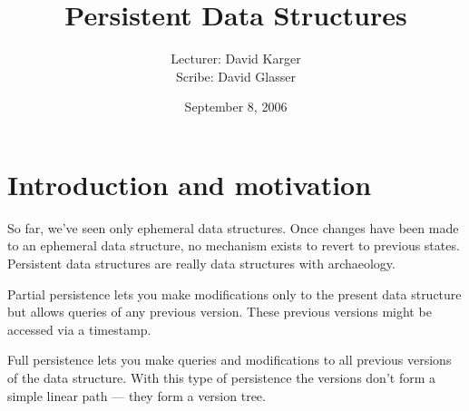 \documentclass{article}
\title{Persistent Data Structures}
\date{September 8, 2006}
\author{Lecturer: David Karger\\ Scribe: David Glasser}
\begin{document}
%

%
%
%
%

%


\section{Introduction and motivation}
\label{crp}

So far, we've seen only ephemeral data structures.  Once changes have been made to an
ephemeral data structure, no mechanism exists to revert to  previous states.  Persistent
data structures are really data structures with archaeology.

Partial persistence lets you make modifications only to the present data structure but
allows queries of any previous version.  These previous versions might be accessed via
a timestamp.

Full persistence lets you make queries and modifications to all previous versions of the
data structure.  With this type of persistence the versions don't form a simple linear
path --- they form a version tree.
\end{document}
